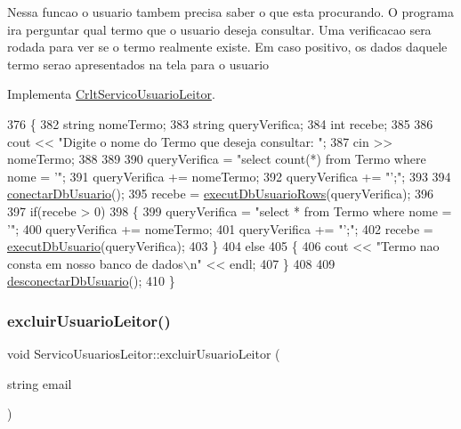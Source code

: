 Nessa funcao o usuario tambem precisa saber o que esta procurando. O programa ira perguntar qual termo que o usuario deseja consultar. Uma verificacao sera rodada para ver se o termo realmente existe. Em caso positivo, os dados daquele termo serao apresentados na tela para o usuario

Implementa \mbox{\hyperlink{class_crlt_servico_usuario_leitor_a4b381e72dddde7fffc5a75328dbf3198}{Crlt\+Servico\+Usuario\+Leitor}}.


\begin{DoxyCode}
376   \{
382     \textcolor{keywordtype}{string} nomeTermo;
383     \textcolor{keywordtype}{string} queryVerifica;
384     \textcolor{keywordtype}{int} recebe;
385 
386     cout << \textcolor{stringliteral}{"Digite o nome do Termo que deseja consultar: "};
387     cin >> nomeTermo;
388 
389 
390     queryVerifica = \textcolor{stringliteral}{"select count(*) from Termo where nome = '"};
391     queryVerifica += nomeTermo;
392     queryVerifica += \textcolor{stringliteral}{"';"};
393 
394     \mbox{\hyperlink{comando_sql_8cpp_a4f89ddcbc4cf8f2587d89f72f8c7900d}{conectarDbUsuario}}();
395     recebe = \mbox{\hyperlink{comando_sql_8cpp_af54952694f2fa7d76f969fb74b853cb9}{executDbUsuarioRows}}(queryVerifica);
396 
397     \textcolor{keywordflow}{if}(recebe > 0)
398         \{
399           queryVerifica = \textcolor{stringliteral}{"select * from Termo where nome = '"};
400           queryVerifica += nomeTermo;
401           queryVerifica += \textcolor{stringliteral}{"';"};
402           recebe = \mbox{\hyperlink{comando_sql_8cpp_a748197580e7f9acdbf48c78de1f7924b}{executDbUsuario}}(queryVerifica);
403         \}
404     \textcolor{keywordflow}{else}
405         \{
406           cout << \textcolor{stringliteral}{"Termo nao consta em nosso banco de dados\(\backslash\)n"} << endl;
407         \}
408 
409         \mbox{\hyperlink{comando_sql_8cpp_a969be9911913568e30d4ae8963338bc3}{desconectarDbUsuario}}();
410     \}
\end{DoxyCode}
\mbox{\label{class_servico_usuarios_leitor_adce08fccebc11dbd5f395b8a4bb23d2a}} 
\subsubsection{\texorpdfstring{excluir\+Usuario\+Leitor()}{excluirUsuarioLeitor()}}
{\footnotesize\ttfamily void Servico\+Usuarios\+Leitor\+::excluir\+Usuario\+Leitor (\begin{DoxyParamCaption}\item[{string}]{email }\end{DoxyParamCaption})\hspace{0.3cm}{\ttfamily [virtual]}}

